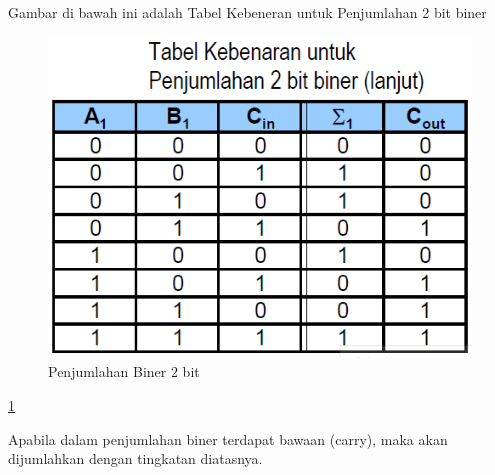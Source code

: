 Gambar di bawah ini adalah Tabel Kebeneran untuk Penjumlahan 2 bit biner
	\begin{figure} [ht]
	\centerline{\includegraphics[width=1\textwidth]{figures/Biner2angka.png}}
	\caption{Penjumlahan Biner 2 bit}
	\label{Biner2angka}
	\end{figure}
\ref{Biner2angka}

Apabila dalam penjumlahan biner terdapat bawaan (carry), maka akan dijumlahkan dengan tingkatan diatasnya.

\cite{wang201140}
\cite{brent1970addition}
\cite{detmer2001introduction}
\cite{nurhayati2010aritmatik}
\cite{dosen2013matematika}
